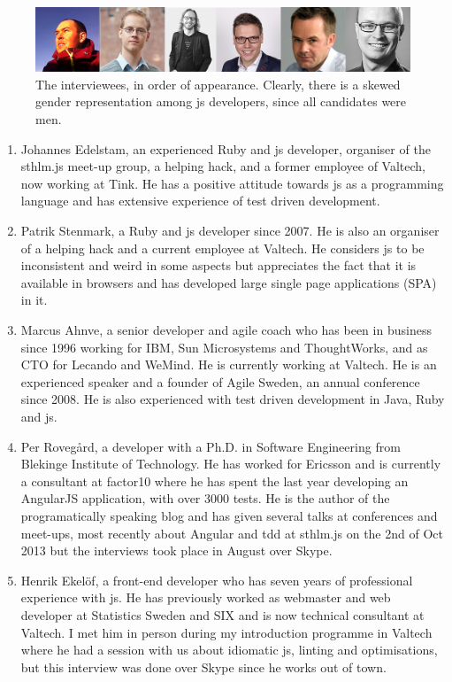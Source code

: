 \documentclass[11pt]{article}
\begin{document}
\begin{figure}[ht]
\centering
\includegraphics[width=\textwidth]{pics/interviewees.png}
\caption{The interviewees, in order of appearance. Clearly, there is a skewed gender representation among \gls{js} developers, since all candidates were men.}
\label{fig:interviewees}
\end{figure}

\begin{enumerate}
\item Johannes Edelstam, an experienced Ruby and \gls{js} developer, organiser of the sthlm.js meet-up group, a helping hack, and a former employee of Valtech, now working at Tink. He has a positive attitude towards \gls{js} as a programming language and has extensive experience of test driven development.

\item Patrik Stenmark, a Ruby and \gls{js} developer since 2007. He is also an organiser of a helping hack and a current employee at Valtech. He considers \gls{js} to be inconsistent and weird in some aspects but appreciates the fact that it is available in browsers and has developed large single page applications (SPA) in it.

\item Marcus Ahnve, a senior developer and agile coach who has been in business since 1996 working for IBM, Sun Microsystems and ThoughtWorks, and as CTO for Lecando and WeMind. He is currently working at Valtech. He is an experienced speaker and a founder of Agile Sweden, an annual conference since 2008. He is also experienced with test driven development in Java, Ruby and \gls{js}.

\item Per Rovegård, a developer with a Ph.D. in Software Engineering from Blekinge Institute of Technology. He has worked for Ericsson and is currently a consultant at factor10 where he has spent the last year developing an AngularJS application, with over 3000 tests. He is the author of the programatically speaking blog and has given several talks at conferences and meet-ups, most recently about Angular and \gls{tdd} at sthlm.js on the 2nd of Oct 2013 but the interviews took place in August over Skype.

\item Henrik Ekelöf, a front-end developer who has seven years of professional experience with \gls{js}. He has previously worked as webmaster and web developer at Statistics Sweden and SIX and is now technical consultant at Valtech. I met him in person during my introduction programme in Valtech where he had a session with us about idiomatic \gls{js}, linting and optimisations, but this interview was done over Skype since he works out of town.


\end{enumerate}
\end{document}
